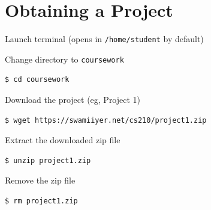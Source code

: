 \documentclass[8pt,a4paper,compress]{beamer}
\begin{document}
\section{Obtaining a Project}
\begin{frame}[fragile]
\pause\transdissolve

Launch terminal (opens in \lstinline{/home/student} by default)

\pause\transdissolve\bigskip

Change directory to \lstinline{coursework}

\begin{tcolorbox}[enhanced,drop shadow southwest,sharp corners,size=fbox,colback=black]
\begin{lstlisting}[style=terminal]
$ cd coursework
\end{lstlisting}
\end{tcolorbox}

\pause\transdissolve\bigskip

Download the project (eg, Project 1)

\begin{tcolorbox}[enhanced,drop shadow southwest,sharp corners,size=fbox,colback=black]
\begin{lstlisting}[style=terminal]
$ wget https://swamiiyer.net/cs210/project1.zip
\end{lstlisting}
\end{tcolorbox}

\pause\transdissolve\bigskip

Extract the downloaded zip file

\begin{tcolorbox}[enhanced,drop shadow southwest,sharp corners,size=fbox,colback=black]
\begin{lstlisting}[style=terminal]
$ unzip project1.zip
\end{lstlisting}
\end{tcolorbox}

\pause\transdissolve\bigskip

Remove the zip file

\begin{tcolorbox}[enhanced,drop shadow southwest,sharp corners,size=fbox,colback=black]
\begin{lstlisting}[style=terminal]
$ rm project1.zip
\end{lstlisting}
\end{tcolorbox}
\end{frame}
\end{document}
